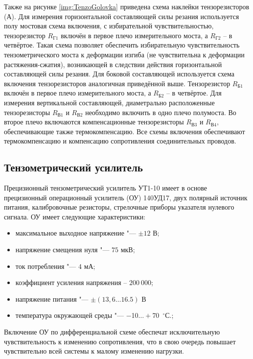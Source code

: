 Также на рисунке \ref{img:TenzoGolovka} приведена схема наклейки тензорезисторов (А). Для измерения горизонтальной составляющей силы резания используется полу мостовая схема включения, с избирательной чувствительностью, тензорезистор $R_{\text{Г}1}$ включён в первое плечо измерительного моста, а $R_{\text{Г}2}$ – в четвёртое. Такая схема позволяет обеспечить избирательную чувствительность тензометрического моста к деформации изгиба (не чувствительна к деформации растяжения-сжатия), возникающей в следствии действия горизонтальной составляющей силы резания. Для боковой составляющей используется схема включения тензорезисторов аналогичная приведённой выше. Тензорезистор $R_{\text{Б}1}$ включён в первое плечо измерительного моста, а $R_{\text{Б}2}$ – в четвёртое. Для измерения вертикальной составляющей, диаметрально расположенные тензорезисторы $R_{\text{В}1}$ и $R_{\text{В}2}$ необходимо включить в одно плечо полумоста. Во второе плечо включаются компенсационные тензорезисторы $R_{\text{В}3}$ и $R_{\text{В}4}$, обеспечивающие также термокомпенсацию. Все схемы включения обеспечивают термокомпенсацию и компенсацию сопротивления соединительных проводов.


\subsection{Тензометрический усилитель}\label{subsect2_4_2}

Прецизионный тензометрический усилитель УТ1-10 имеет в основе прецизионный операционный усилитель (ОУ) 140УД17, двух полярный источник питания, калибровочные резисторы, стрелочные приборы указателя нулевого сигнала. ОУ имеет следующие характеристики:
\begin{itemize}
	\item максимальное выходное напряжение "--- $\pm12$ В;
	\item напряжение смещения нуля "--- $75$ мкВ;
	\item ток потребления "--- $4$ мА;
	\item коэффициент усиления напряжения – $200~000$;
	\item напряжение питания "--- $\pm(13,6\ldots16.5)$ В
	\item температура окружающей среды "--- $-$10$\ldots+$70~${}^\circ$С.;
\end{itemize}

Включение ОУ по дифференциальной схеме обеспечат исключительную чувствительность к изменению сопротивления, что в свою очередь повышает чувствительно всей системы к малому изменению нагрузки.



